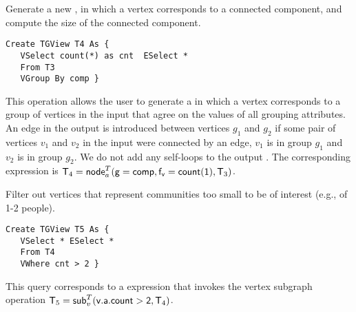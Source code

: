 

\begin{example}
\label{ex:nodecra}

Generate a new \tg, in which a vertex corresponds to a connected
component, and compute the size of the connected component.  

\begin{small} 
\begin{verbatim}
Create TGView T4 As { 
   VSelect count(*) as cnt  ESelect *
   From T3
   VGroup By comp }
\end{verbatim}
\end{small}

\end{example}

This operation allows the user to generate a \tg in which a vertex
corresponds to a group of vertices in the input that agree on the
values of all grouping attributes.  An edge in the output is
introduced between vertices $g_1$ and $g_2$ if some pair of vertices
$v_1$ and $v_2$ in the input \tg were connected by an edge, $v_1$ is
in group $g_1$ and $v_2$ is in group $g_2$.  We do not add any
self-loops to the output \tg. The corresponding \tga expression is
$\mathsf{T}_4 = \textsf{node}^T_a(\mathsf{g=comp,f_v=count(1)},\mathsf{T}_3)$.


\begin{example}
\label{ex:subg}

Filter out vertices that represent communities too small to be of
interest (e.g., of 1-2 people).  

\begin{small} 
\begin{verbatim}
Create TGView T5 As {
   VSelect * ESelect *
   From T4
   VWhere cnt > 2 }
\end{verbatim}
\end{small}

This query corresponds to a \tga expression that invokes the vertex
subgraph operation $\mathsf{T}_5 = \textsf{sub}^T_v(\mathsf{v.a.count > 2},\mathsf{T}_4)$.

\end{example}

